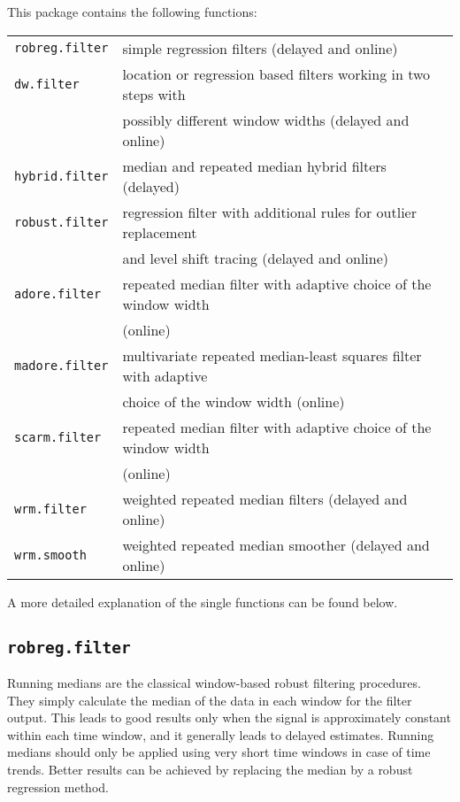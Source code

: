 \documentclass[a4paper]{scrartcl}
\begin{document}
This package contains the following functions: \vspace*{0.25cm} \\
\begin{tabular}{ll}
\texttt{robreg.filter} & simple regression filters (delayed and online) \\
\texttt{dw.filter}     & location or regression based filters working in two steps with \\
                       & possibly different window widths (delayed and online)\\
\texttt{hybrid.filter} & median and repeated median hybrid filters (delayed)\\
\texttt{robust.filter} & regression filter with additional rules for outlier replacement \\
                       & and level shift tracing (delayed and online)\\
\texttt{adore.filter}  & repeated median filter with adaptive choice of the window width\\
                       & (online)\\
\texttt{madore.filter} & multivariate repeated median-least squares filter with adaptive\\
											 & choice of the window width (online)\\
\texttt{scarm.filter}  & repeated median filter with adaptive choice of the window width\\
                       & (online)\\
\texttt{wrm.filter}    & weighted repeated median filters (delayed and online)\\
\texttt{wrm.smooth}    & weighted repeated median smoother (delayed and online)
\end{tabular} \vspace*{0.25cm}

\noindent
A more detailed explanation of the single functions can be found
below.

\newpage
\subsection{\texttt{robreg.filter}}

Running medians are the classical window-based robust filtering
procedures. They simply calculate the median of the data in each
window for the filter output. This leads to good results only when
the signal is approximately constant within each time window, and
it generally leads to delayed estimates. Running medians should
only be applied using very short time windows in case of time
trends. Better results %
can be achieved by replacing the median by a robust regression
method.
\end{document}
